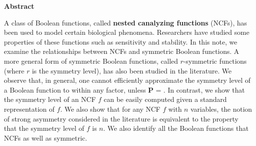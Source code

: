 \vspace*{-0.05in}
\begin{center}
\textbf{Abstract}  %
\end{center}

\smallskip

A class of Boolean functions, 
called \textbf{nested canalyzing functions} (NCFs),
has been used to model certain biological phenomena.
Researchers have studied some properties of these functions
such as sensitivity and stability.
In this note, we examine the relationships between NCFs and symmetric 
Boolean functions. 
A more general form of symmetric Boolean functions,
called $r$-symmetric functions (where $r$ is the symmetry level),
has also been studied in the literature.
We observe that, in general,
one cannot efficiently approximate the symmetry level of
a Boolean function to within any factor, unless \textbf{P} = \cnp. 
In contrast, we show that the symmetry level of an NCF $f$
can be easily computed given a standard representation of $f$.
We also show that for any NCF $f$ with $n$ variables, the notion of
strong asymmetry considered in the literature is equivalent to
the property that the symmetry level of $f$ is $n$.
We also identify all the Boolean functions that NCFs 
as well as symmetric. 

